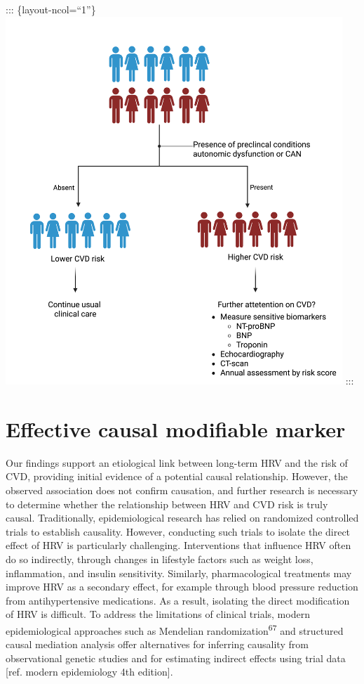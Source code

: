 \documentclass[
  a4paper,
  headsepline=true,
  open=any]{scrbook}
\begin{document}
::: \{layout-ncol=``1''\}
\includegraphics[width=5in,height=\textheight]{images/strafication_tree_of_CAN.png}
:::

\hypertarget{effective-causal-modifiable-marker}{%
\section{Effective causal modifiable
marker}\label{effective-causal-modifiable-marker}}

Our findings support an etiological link between long-term HRV and the
risk of CVD, providing initial evidence of a potential causal
relationship. However, the observed association does not confirm
causation, and further research is necessary to determine whether the
relationship between HRV and CVD risk is truly causal. Traditionally,
epidemiological research has relied on randomized controlled trials to
establish causality. However, conducting such trials to isolate the
direct effect of HRV is particularly challenging. Interventions that
influence HRV often do so indirectly, through changes in lifestyle
factors such as weight loss, inflammation, and insulin sensitivity.
Similarly, pharmacological treatments may improve HRV as a secondary
effect, for example through blood pressure reduction from
antihypertensive medications. As a result, isolating the direct
modification of HRV is difficult. To address the limitations of clinical
trials, modern epidemiological approaches such as Mendelian
randomization\textsuperscript{67} and structured causal mediation
analysis offer alternatives for inferring causality from observational
genetic studies and for estimating indirect effects using trial data
{[}ref. modern epidemiology 4th edition{]}.
\end{document}

